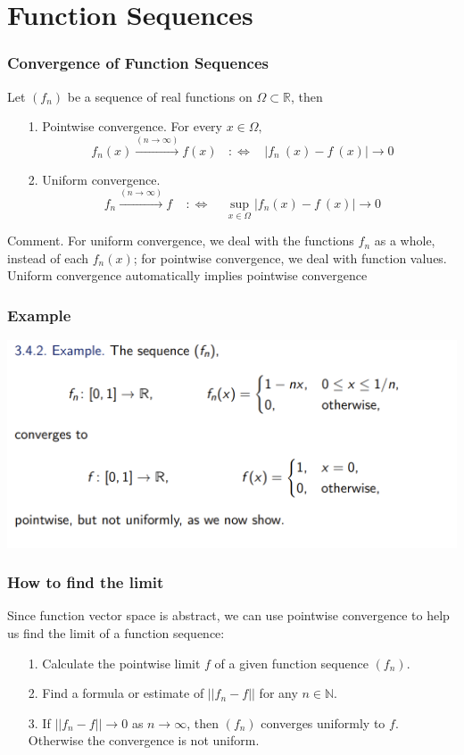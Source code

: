 \documentclass{beamer}
\begin{document}
\section{Function Sequences}
\begin{frame}
    \frametitle{Convergence of Function Sequences}
    Let $(f_n)$ be a sequence of real functions on $\Omega \subset \mathbb{R}$, then \\
    \begin{itemize}
        \item [1.]Pointwise convergence. For every $x \in \Omega,$ $$f_n (x) \xrightarrow{(n\to \infty)} f(x) ~~~~  :\Leftrightarrow ~~~~ |f_n ~(x)-f~(x)|\to 0$$
        \item [2.]Uniform convergence. $$f_n \xrightarrow{(n\to \infty)} f  ~~~~~:\Leftrightarrow ~~~~~  \underset{x \in \Omega}{\sup} ⁡|f_n (x)-f~(x)|\to 0 $$
    \end{itemize}

	Comment. For uniform convergence, we deal with the functions $f_n$ as a whole, instead of each $f_n (x)$; 
    for pointwise convergence, we deal with function values. Uniform convergence automatically implies pointwise convergence
    

\end{frame}
\begin{frame}
    \frametitle{Example}
    \centering
    \includegraphics[width=1\textwidth]{seq_of_func.png}
\end{frame}
\begin{frame}
    \frametitle{How to find the limit}
    \hspace{1em}
    Since function vector space is abstract, we can use pointwise convergence
to help us find the limit of a function sequence:\\
\vspace{1em}
\begin{itemize}
    \item [1.]Calculate the pointwise limit $f$ of a given function sequence $(f_n)$.
    \item [2.] Find a formula or estimate of $||f_n - f||$ for any $ n \in \mathbb{N} $.
    \item [3.] If $||f_n - f|| \to 0$ as $n \to \infty$, then $(f_n)$ converges uniformly to $f$. 
    Otherwise the convergence is not uniform.
\end{itemize}

\end{frame}
\end{document}
